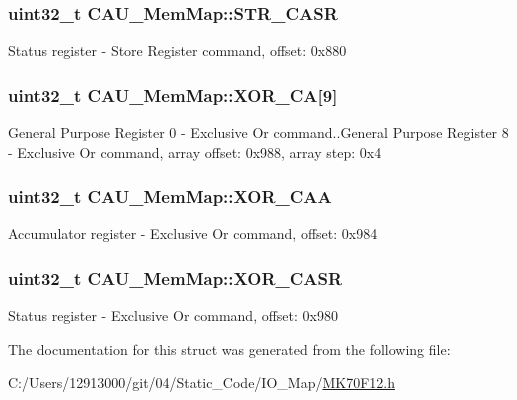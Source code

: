 \subsubsection[{S\+T\+R\+\_\+\+C\+A\+S\+R}]{\setlength{\rightskip}{0pt plus 5cm}uint32\+\_\+t C\+A\+U\+\_\+\+Mem\+Map\+::\+S\+T\+R\+\_\+\+C\+A\+S\+R}\label{struct_c_a_u___mem_map_ad90eef15bc61290af107c3d5871599a8}
Status register -\/ Store Register command, offset\+: 0x880 \hypertarget{struct_c_a_u___mem_map_acb520a0239533ff35af926264fd9a6a9}{}
\subsubsection[{X\+O\+R\+\_\+\+C\+A}]{\setlength{\rightskip}{0pt plus 5cm}uint32\+\_\+t C\+A\+U\+\_\+\+Mem\+Map\+::\+X\+O\+R\+\_\+\+C\+A\mbox{[}9\mbox{]}}\label{struct_c_a_u___mem_map_acb520a0239533ff35af926264fd9a6a9}
General Purpose Register 0 -\/ Exclusive Or command..General Purpose Register 8 -\/ Exclusive Or command, array offset\+: 0x988, array step\+: 0x4 \hypertarget{struct_c_a_u___mem_map_a5597e40ecdc9aaf07f342eea55467ff1}{}
\subsubsection[{X\+O\+R\+\_\+\+C\+A\+A}]{\setlength{\rightskip}{0pt plus 5cm}uint32\+\_\+t C\+A\+U\+\_\+\+Mem\+Map\+::\+X\+O\+R\+\_\+\+C\+A\+A}\label{struct_c_a_u___mem_map_a5597e40ecdc9aaf07f342eea55467ff1}
Accumulator register -\/ Exclusive Or command, offset\+: 0x984 \hypertarget{struct_c_a_u___mem_map_a9a390a748c987c883432ae79087640e2}{}
\subsubsection[{X\+O\+R\+\_\+\+C\+A\+S\+R}]{\setlength{\rightskip}{0pt plus 5cm}uint32\+\_\+t C\+A\+U\+\_\+\+Mem\+Map\+::\+X\+O\+R\+\_\+\+C\+A\+S\+R}\label{struct_c_a_u___mem_map_a9a390a748c987c883432ae79087640e2}
Status register -\/ Exclusive Or command, offset\+: 0x980 

The documentation for this struct was generated from the following file\+:\begin{DoxyCompactItemize}
\item 
C\+:/\+Users/12913000/git/04/\+Static\+\_\+\+Code/\+I\+O\+\_\+\+Map/\hyperlink{_m_k70_f12_8h}{M\+K70\+F12.\+h}\end{DoxyCompactItemize}
